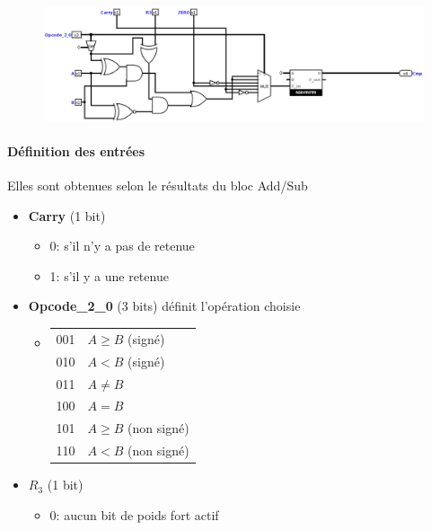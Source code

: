 \documentclass[a4paper]{article}
\begin{document}
\begin{tcolorbox}[colframe=Monokaimagenta,colback=white]

\begin{figure}[H]
    \centering
    \includegraphics[width=\textwidth]{src/COMPATEUR.png}
    \label{fig:OVERFADDSUB_4BITS}
\end{figure}

\paragraph{Définition des entrées}
Elles sont obtenues selon le résultats du bloc Add/Sub
\begin{itemize}
\item \textbf{Carry} (1 bit)
     \begin{itemize}
            \item 0: s'il n'y a pas de retenue
            \item 1: s'il y a une retenue
        \end{itemize}
\item \textbf{Opcode\_2\_0} (3 bits) définit l'opération choisie
     \begin{itemize}
     \smallskip
            \item \begin{tabular}{ |l | l| }
                    001   & $A \ge B$ (signé) \\
                    010   & $A < B$ (signé) \\
                    011   & $A \ne B$\\
                    100   & $A = B$ \\
                    101   & $A \ge B$ (non signé) \\
                    110   & $A < B$ (non signé) \\
    \end{tabular}
        \end{itemize}
\item $R_3$ (1 bit) 
\begin{itemize}
            \item 0: aucun bit de poids fort actif

\end{itemize}
\end{itemize}
\end{tcolorbox}
\end{document}
